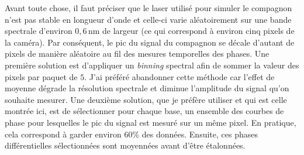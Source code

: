 Avant toute chose, il faut préciser que le laser utilisé pour simuler le compagnon n'est pas stable en longueur d'onde et celle-ci varie aléatoirement sur une bande spectrale d'environ $0,6 \,$nm de largeur (ce qui correspond à environ cinq pixels de la caméra). Par conséquent, le pic du signal du compagnon se décale d'autant de pixels de manière aléatoire au fil des mesures temporelles des phases. Une première solution est d'appliquer un \textit{binning} spectral afin de sommer la valeur des pixels par paquet de $5$. J'ai préféré abandonner cette méthode car l'effet de moyenne dégrade la résolution spectrale et diminue l'amplitude du signal qu'on souhaite mesurer. Une deuxième solution, que je préfère utiliser et qui est celle montrée ici, est de sélectionner pour chaque base, un ensemble des courbes de phase pour lesquelles le pic du signal est mesuré sur un même pixel. En pratique, cela correspond à garder environ $60\%$ des données. Ensuite, ces phases différentielles sélectionnées sont moyennées avant d'être étalonnées.

